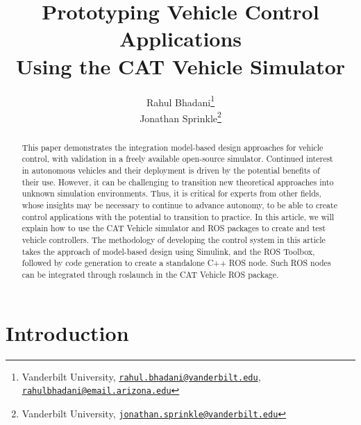 \documentclass[
]{article}
\title{Prototyping Vehicle Control Applications\\Using the CAT Vehicle Simulator}
\author{Rahul Bhadani\footnote{Vanderbilt University,
  \href{mailto:rahul.bhadani@vanderbilt.edu}{\nolinkurl{rahul.bhadani@vanderbilt.edu}},
  \href{mailto:rahulbhadani@email.arizona.edu}{\nolinkurl{rahulbhadani@email.arizona.edu}}}\\
  Jonathan Sprinkle\footnote{Vanderbilt University,
  \href{mailto:jonathan.sprinkle@vanderbilt.edu}{\nolinkurl{jonathan.sprinkle@vanderbilt.edu}}  }}
\date{}
\begin{document}
\maketitle
\begin{abstract}
This paper demonstrates the integration model-based design approaches
for vehicle control, with validation in a freely available open-source
simulator. 
Continued interest in autonomous vehicles and their deployment is driven
by the potential benefits of their use. However, it can be challenging
to transition new theoretical approaches into unknown simulation environments. 
Thus, it is critical for experts from other fields, whose insights may be 
necessary to continue to advance autonomy, to be able to create
control applications with the potential to transition to practice.
In this article, we will explain how to use the CAT
Vehicle simulator and ROS packages to create and test vehicle controllers. The
methodology of developing the control system in this article takes the
approach of model-based design using Simulink, and the ROS Toolbox, followed
by code generation to create a standalone C++ ROS node. Such ROS nodes
can be integrated through roslaunch in the CAT Vehicle ROS package.
\end{abstract}

\hypertarget{methods}{%
\section{Introduction}\label{methods}}
\end{document}
